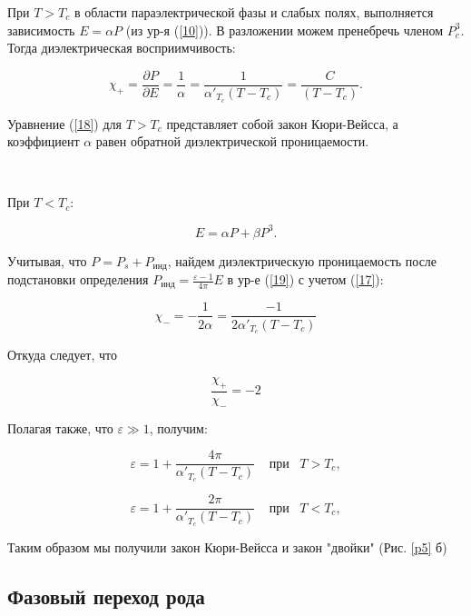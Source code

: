 \documentclass[a4paper]{article}
\begin{document}
При $T > T_c$ в области параэлектрической фазы и слабых полях, выполняется зависимость $E = \alpha P$ (из ур-я (\ref{10})). В разложении можем пренебречь членом $P^3_c$. Тогда диэлектрическая восприимчивость:

\begin{equation}
\chi_+  = \frac{\partial P}{\partial E} = \frac{1}{\alpha} = \frac{1}{\alpha'_{T_c} (T - T_c)} = \frac{C}{(T - T_c)}. 
\label{18}
\end{equation}

Уравнение (\ref{18}) для $T > T_c$ представляет собой закон Кюри-Вейсса, а коэффициент $\alpha $ равен обратной диэлектрической проницаемости. 

 \
 
При $T < T_c$:
 
 \begin{equation}
E = \alpha P + \beta P^3. 
\label{19}
\end{equation}

Учитывая, что $P = P_s + P_{\text{инд}}$, найдем диэлектрическую проницаемость после подстановки  определения $P_{\text{инд}} = \frac{\varepsilon - 1}{4\pi} E$ в ур-е (\ref{19}) с учетом (\ref{17}):

\begin{equation}
\chi_- = -\frac{1}{2 \alpha} = \frac{-1}{2\alpha'_{T_c} (T - T_c)}
\label{20}
\end{equation}

Откуда следует, что

\begin{equation}
\frac{\chi_+}{\chi_-} = -2
\label{21}
\end{equation}

Полагая также, что $\varepsilon \gg 1$, получим:

\begin{equation}
\varepsilon = 1 + \frac{4\pi}{\alpha'_{T_c} (T - T_c)} \; \; \; \; \text{при} \; \; \; T > T_c,
\label{22}
\end{equation}

\begin{equation}
\varepsilon = 1 + \frac{2\pi}{\alpha'_{T_c} (T - T_c)} \; \; \; \; \text{при} \; \; \; T < T_c,
\label{23}
\end{equation}

Таким образом мы получили закон Кюри-Вейсса и закон "двойки" (Рис. \ref{p5} б)

\subsection{Фазовый переход  рода}
\end{document}
